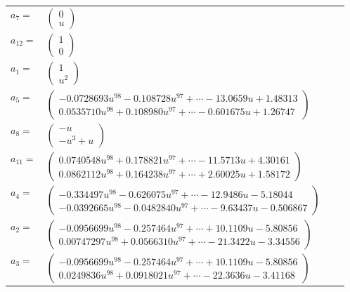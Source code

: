 \documentclass[1p]{elsarticle_modified}
\theoremstyle{definition}
\begin{document}
\begin{tabular}{m{7pt} m{180pt} m{7pt} m{180pt} }
\flushright $a_{7}=$&$\begin{pmatrix}0\\u\end{pmatrix}$ \\
\flushright $a_{12}=$&$\begin{pmatrix}1\\0\end{pmatrix}$ \\
\flushright $a_{1}=$&$\begin{pmatrix}1\\u^2\end{pmatrix}$ \\
\flushright $a_{5}=$&$\begin{pmatrix}-0.0728693 u^{98}-0.108728 u^{97}+\cdots-13.0659 u+1.48313\\0.0535710 u^{98}+0.108980 u^{97}+\cdots-0.601675 u+1.26747\end{pmatrix}$ \\
\flushright $a_{8}=$&$\begin{pmatrix}- u\\- u^3+u\end{pmatrix}$ \\
\flushright $a_{11}=$&$\begin{pmatrix}0.0740548 u^{98}+0.178821 u^{97}+\cdots-11.5713 u+4.30161\\0.0862112 u^{98}+0.164238 u^{97}+\cdots+2.60025 u+1.58172\end{pmatrix}$ \\
\flushright $a_{4}=$&$\begin{pmatrix}-0.334497 u^{98}-0.626075 u^{97}+\cdots-12.9486 u-5.18044\\-0.0392665 u^{98}-0.0482840 u^{97}+\cdots-9.63437 u-0.506867\end{pmatrix}$ \\
\flushright $a_{2}=$&$\begin{pmatrix}-0.0956699 u^{98}-0.257464 u^{97}+\cdots+10.1109 u-5.80856\\0.00747297 u^{98}+0.0566310 u^{97}+\cdots-21.3422 u-3.34556\end{pmatrix}$ \\
\flushright $a_{3}=$&$\begin{pmatrix}-0.0956699 u^{98}-0.257464 u^{97}+\cdots+10.1109 u-5.80856\\0.0249836 u^{98}+0.0918021 u^{97}+\cdots-22.3636 u-3.41168\end{pmatrix}$ \\

\end{tabular}
\end{document}

